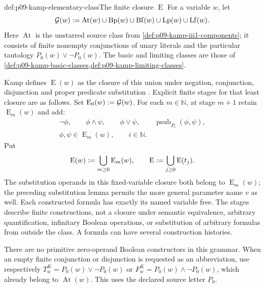 \begin{hbdefinition}{def:p09-kamp-elementary-class}{The finite closure \(\operatorname{E}\)}
For a variable \(w\), let
\[
 \mathcal G(w)\mathrel{:=}
  \operatorname{At}(w)\cup\operatorname{Bp}(w)
  \cup\operatorname{Bf}(w)\cup\operatorname{Lp}(w)
  \cup\operatorname{Lf}(w).
\]
Here \(\operatorname{At}\) is the unstarred source class from
\cref{def:p09-kamp-iii1-components}; it consists of finite nonempty
conjunctions of unary literals and the particular tautology
\(P_0(w)\lor\neg P_0(w)\). The basic and limiting classes are those
of \cref{def:p09-kamp-basic-classes,def:p09-kamp-limiting-classes}.

Kamp defines \(\operatorname{E}(w)\) as the closure of this union under
negation, conjunction, disjunction and proper predicate substitution
\cite[ch.~III, p.~67]{Kamp1968}. Explicit finite stages for that least
closure are as follows. Set \(\operatorname{E}_0(w)\mathrel{:=}\mathcal G(w)\).
For each \(m\in\mathbb N\), at stage \(m+1\) retain
\(\operatorname{E}_m(w)\) and add:
\[
\begin{gathered}
 \neg\phi,\qquad \phi\land\psi,\qquad \phi\lor\psi,
 \qquad \operatorname{psub}_{P_i}(\phi,\psi),\\
 \phi,\psi\in\operatorname{E}_m(w),\qquad i\in\mathbb N.
\end{gathered}
\]
Put
\[
 \operatorname{E}(w)\mathrel{:=}\bigcup_{m\geq0}\operatorname{E}_m(w),
 \qquad
 \operatorname{E}\mathrel{:=}\bigcup_{j\geq0}\operatorname{E}(t_j).
\]
The substitution operands in this fixed-variable closure both belong to
\(\operatorname{E}_m(w)\); the preceding substitution lemma permits the
more general parameter name \(v\) as well. Each constructed formula has
exactly its named variable free. The stages describe finite constructions,
not a closure under semantic equivalence, arbitrary quantification,
infinitary Boolean operations, or substitution of arbitrary formulas from
outside the class. A formula can have several construction histories.

There are no primitive zero-operand Boolean constructors in this grammar.
When an empty finite conjunction or disjunction is requested as an
abbreviation, use respectively
\(T^K_w=P_0(w)\lor\neg P_0(w)\) or
\(F^K_w=P_0(w)\land\neg P_0(w)\), which already belong to
\(\operatorname{At}(w)\). This uses the declared source letter \(P_0\).
\end{hbdefinition}

